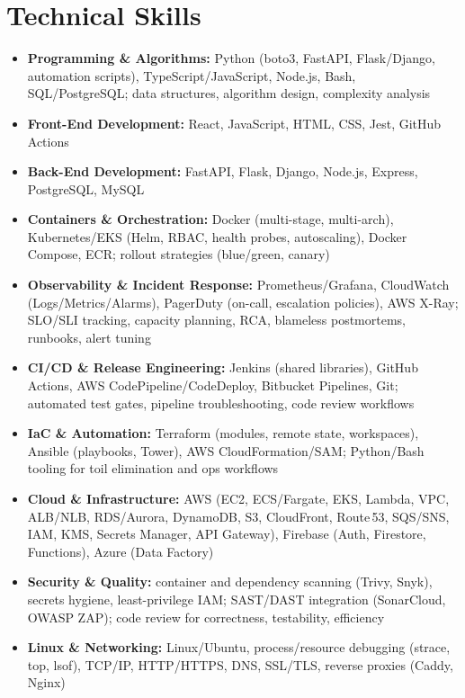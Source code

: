 \documentclass[10pt,a4paper]{article}
\begin{document}
\section*{Technical Skills}
\begin{itemize}
  \item \textbf{Programming \& Algorithms:} Python (boto3, FastAPI, Flask/Django, automation scripts), TypeScript/JavaScript, Node.js, Bash, SQL/PostgreSQL; data structures, algorithm design, complexity analysis
  \item \textbf{Front-End Development:} React, JavaScript, HTML, CSS, Jest, GitHub Actions
  \item \textbf{Back-End Development:} FastAPI, Flask, Django, Node.js, Express, PostgreSQL, MySQL
  \item \textbf{Containers \& Orchestration:} Docker (multi-stage, multi-arch), Kubernetes/EKS (Helm, RBAC, health probes, autoscaling), Docker Compose, ECR; rollout strategies (blue/green, canary)
  \item \textbf{Observability \& Incident Response:} Prometheus/Grafana, CloudWatch (Logs/Metrics/Alarms), PagerDuty (on-call, escalation policies), AWS X-Ray; SLO/SLI tracking, capacity planning, RCA, blameless postmortems, runbooks, alert tuning
  \item \textbf{CI/CD \& Release Engineering:} Jenkins (shared libraries), GitHub Actions, AWS CodePipeline/CodeDeploy, Bitbucket Pipelines, Git; automated test gates, pipeline troubleshooting, code review workflows
  \item \textbf{IaC \& Automation:} Terraform (modules, remote state, workspaces), Ansible (playbooks, Tower), AWS CloudFormation/SAM; Python/Bash tooling for toil elimination and ops workflows
  \item \textbf{Cloud \& Infrastructure:} AWS (EC2, ECS/Fargate, EKS, Lambda, VPC, ALB/NLB, RDS/Aurora, DynamoDB, S3, CloudFront, Route\,53, SQS/SNS, IAM, KMS, Secrets Manager, API Gateway), Firebase (Auth, Firestore, Functions), Azure (Data Factory)
  \item \textbf{Security \& Quality:} container and dependency scanning (Trivy, Snyk), secrets hygiene, least-privilege IAM; SAST/DAST integration (SonarCloud, OWASP ZAP); code review for correctness, testability, efficiency
  \item \textbf{Linux \& Networking:} Linux/Ubuntu, process/resource debugging (strace, top, lsof), TCP/IP, HTTP/HTTPS, DNS, SSL/TLS, reverse proxies (Caddy, Nginx)
\end{itemize}
\end{document}
